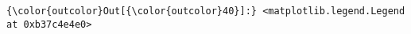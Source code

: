 \documentclass[11pt]{article}
\begin{document}
\begin{Verbatim}[commandchars=\\\{\}]
{\color{outcolor}Out[{\color{outcolor}40}]:} <matplotlib.legend.Legend at 0xb37c4e4e0>
\end{Verbatim}
            
    \begin{center}
    \end{center}
    { \hspace*{\fill} \\}
    

    
    
    
    
\end{document}
